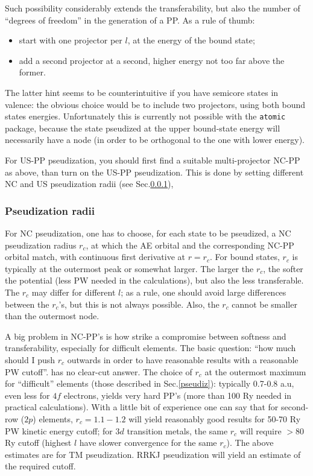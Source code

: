 \documentclass[12pt,a4paper]{article}
\begin{document}
Such possibility considerably extends the transferability, but also the 
number of ``degrees of freedom'' in the generation of a PP. As a rule of 
thumb: 
\begin{itemize}
\item start with one projector per $l$, at the energy of the bound state;
\item add a second projector at a second, higher energy not too far above 
the former. 
\end{itemize}
The latter hint seems to be counterintuitive if you have semicore states 
in valence: the obvious choice would be to include two projectors, using 
both bound states energies. Unfortunately this is currently not possible 
with the \texttt{atomic} package, because the state pseudized at the upper 
bound-state energy will necessarily have a node (in order to be orthogonal 
to the one with lower energy).

For US-PP pseudization, you should first find a suitable multi-projector 
NC-PP as above, than turn on the US-PP pseudization. This is done by
setting different NC and US pseudization radii (see Sec.\ref{radii}),

\subsubsection{Pseudization radii}
\label{radii}

For NC pseudization, one has to choose, for each state to be pseudized,
a NC pseudization radius $r_c$, at which the AE orbital and the 
corresponding NC-PP orbital match, with continuous first derivative 
at $r=r_c$. For bound states, $r_c$ is typically at the outermost peak or 
somewhat larger. The larger the $r_c$, the softer the potential 
(less PW needed in the calculations), but also the less transferable.
The $r_c$ may differ for different $l$; as a rule, one should avoid large
differences between the $r_c$'s, but this is not always possible. Also,
the $r_c$ cannot be smaller than the outermost node.

A big problem in NC-PP's is how strike a compromise between softness
and transferability, especially for difficult elements. The basic question:
``how much should I push $r_c$ outwards in order to have reasonable results 
with a reasonable PW cutoff''. has no clear-cut answer. The choice of $r_c$ 
at the outermost maximum for ``difficult'' elements (those described in 
Sec.\ref{pseudiz}): typically 0.7-0.8 a.u, even less for $4f$ electrons, 
yields very hard PP's 
(more than 100 Ry needed in practical calculations). With a little bit of 
experience one can say that for second-row ($2p$) elements, $r_c=1.1-1.2$ 
will yield reasonably good results for 50-70 Ry PW kinetic energy cutoff; 
for $3d$ transition metals, the same $r_c$ will require $> 80$ Ry cutoff
(highest $l$ have slower convergence for the same $r_c$). The above
estimates are for TM pseudization. RRKJ pseudization will yield an
estimate of the required cutoff.
\end{document}
